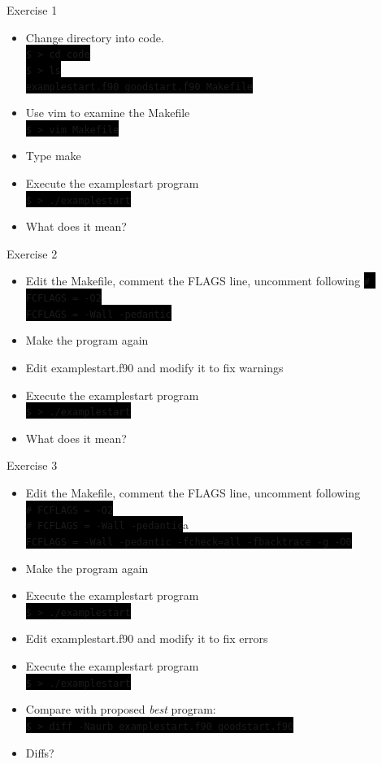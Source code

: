 \documentclass[unknownkeysallowed, 10pt, a4 paper, handout]{beamer}
\newcommand{\code}[1]{\colorbox{black}{\color{green}\texttt{#1}}}
\begin{document}
\begin{frame}[label=exercise1]{Exercise 1}
  \begin{itemize}
    \item Change directory into code. \\
       \code{\$ > cd code} \\
       \code{\$ > ls} \\
       \code{examplestart.f90  goodstart.f90  Makefile}
    \item Use vim to examine the Makefile \\
       \code{\$ > vim Makefile}
    \item Type make
    \item Execute the examplestart program \\
       \code{\$ > ./examplestart}
    \item What does it mean?
  \end{itemize}
\end{frame}


\begin{frame}[label=exercise2]{Exercise 2}
  \begin{itemize}
    \item Edit the Makefile, comment the FLAGS line, uncomment following
       \code{\# FCFLAGS = -O2} \\
       \code{FCFLAGS = -Wall -pedantic}
    \item Make the program again
    \item Edit examplestart.f90 and modify it to fix warnings
    \item Execute the examplestart program \\
       \code{\$ > ./examplestart}
    \item What does it mean?
  \end{itemize}
\end{frame}

\begin{frame}[label=exercise3]{Exercise 3}
  \begin{itemize}
    \item Edit the Makefile, comment the FLAGS line, uncomment following \\
       \code{\# FCFLAGS = -O2} \\
       \code{\# FCFLAGS = -Wall -pedantic}a \\
       \code{FCFLAGS = -Wall -pedantic -fcheck=all -fbacktrace -g -O0}
    \item Make the program again
    \item Execute the examplestart program \\
       \code{\$ > ./examplestart}
    \item Edit examplestart.f90 and modify it to fix errors
    \item Execute the examplestart program \\
       \code{\$ > ./examplestart}
    \item Compare with proposed \textit{best} program: \\
       \code{\$ > diff -Naurb examplestart.f90 goodstart.f90}
    \item Diffs?
  \end{itemize}
\end{frame}
\end{document}
